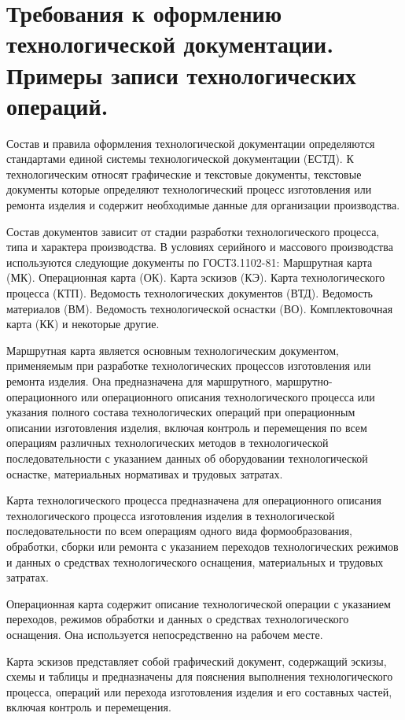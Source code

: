 \documentclass[unicode, 12pt, a4paper, oneside]{article}
\begin{document}
\section{Требования к оформлению технологической документации. Примеры записи технологических операций.}

Состав и правила оформления технологической документации определяются стандартами  единой системы технологической документации (ЕСТД). К технологическим относят графические и текстовые  документы, текстовые документы которые определяют технологический процесс изготовления или ремонта изделия и содержит необходимые данные для организации производства.

Состав документов зависит от стадии разработки технологического процесса, типа и характера производства. В условиях серийного и массового производства используются следующие документы по ГОСТ3.1102-81: Маршрутная карта (МК). Операционная карта (ОК). Карта эскизов (КЭ). Карта технологического процесса (КТП). Ведомость технологических документов (ВТД). Ведомость материалов (ВМ). Ведомость технологической оснастки (ВО). Комплектовочная карта (КК) и некоторые другие.

Маршрутная карта является основным технологическим документом, применяемым при разработке технологических процессов изготовления или ремонта изделия. Она  предназначена для маршрутного, маршрутно-операционного или операционного описания технологического процесса или указания полного состава технологических операций при операционным описании изготовления изделия, включая контроль и перемещения по всем операциям различных технологических методов в технологической последовательности с указанием данных об оборудовании технологической оснастке, материальных нормативах и трудовых затратах.

Карта технологического процесса предназначена для операционного описания технологического процесса изготовления изделия в технологической последовательности по всем операциям одного вида формообразования, обработки, сборки или ремонта с указанием переходов технологических режимов и данных о средствах технологического оснащения, материальных  и трудовых затратах.

Операционная карта содержит описание технологической операции с указанием переходов, режимов обработки и данных о средствах технологического оснащения. Она используется непосредственно  на рабочем месте.

Карта эскизов представляет собой графический документ, содержащий эскизы, схемы и таблицы и предназначены для пояснения выполнения технологического процесса, операций или перехода изготовления изделия и его составных частей, включая контроль и перемещения.
\end{document}
